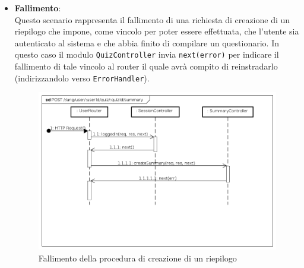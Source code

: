 \begin{itemize}
\item \textbf{Fallimento}:\\
Questo scenario rappresenta il fallimento di una richiesta di creazione di un riepilogo che impone, come vincolo per poter essere effettuata, che l'utente sia autenticato al sistema e che abbia finito di compilare un questionario. In questo caso il modulo \texttt{QuizController} invia \texttt{next(error)} per indicare il fallimento di tale vincolo al router il quale avrà compito di reinstradarlo (indirizzandolo verso \texttt{ErrorHandler}).
\label{Fallimento della procedura di creazione di un riepilogo}
\begin{figure}[ht]
	\centering
	\includegraphics[scale=0.40]{UML/DiagrammiDiSequenza/Back-end/POST__lang_user_userId_quiz_quizId_summary_failure.png}
	\caption{Fallimento della procedura di creazione di un riepilogo}
\end{figure}
\FloatBarrier
\end{itemize}

